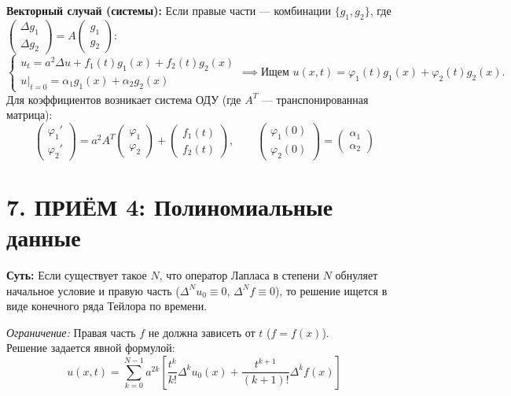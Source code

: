 \noindent\textbf{Векторный случай (системы):} Если правые части — комбинации $\{g_1, g_2\}$, где $\begin{pmatrix} \Delta g_1 \\ \Delta g_2 \end{pmatrix} = A \begin{pmatrix} g_1 \\ g_2 \end{pmatrix}$:
\[
\begin{cases}
u_t = a^2 \Delta u + f_1(t)g_1(x) + f_2(t)g_2(x) \\
u|_{t=0} = \alpha_1 g_1(x) + \alpha_2 g_2(x)
\end{cases}
\implies \text{Ищем } u(x,t) = \varphi_1(t)g_1(x) + \varphi_2(t)g_2(x).
\]
Для коэффициентов возникает система ОДУ (где $A^T$ — транспонированная матрица): 
\[
\begin{pmatrix} \varphi_1' \\ \varphi_2' \end{pmatrix} = 
a^2 A^T \begin{pmatrix} \varphi_1 \\ \varphi_2 \end{pmatrix} + \begin{pmatrix} f_1(t) \\ f_2(t) \end{pmatrix}, \qquad
\begin{pmatrix} \varphi_1(0) \\ \varphi_2(0) \end{pmatrix} = \begin{pmatrix} \alpha_1 \\ \alpha_2 \end{pmatrix}
\]

\section{7. ПРИЁМ 4: Полиномиальные данные}
\textbf{Суть:} Если существует такое $N$, что оператор Лапласа в степени $N$ обнуляет начальное условие и правую часть ($\Delta^N u_0 \equiv 0$, $\Delta^N f \equiv 0$), то решение ищется в виде конечного ряда Тейлора по времени. 

\textit{Ограничение:} Правая часть $f$ не должна зависеть от $t$ ($f = f(x)$). \\
Решение задается явной формулой:
\[
u(x,t) = \sum_{k=0}^{N-1} a^{2k} \left[ \frac{t^k}{k!} \Delta^k u_0(x) + \frac{t^{k+1}}{(k+1)!} \Delta^k f(x) \right]
\]

